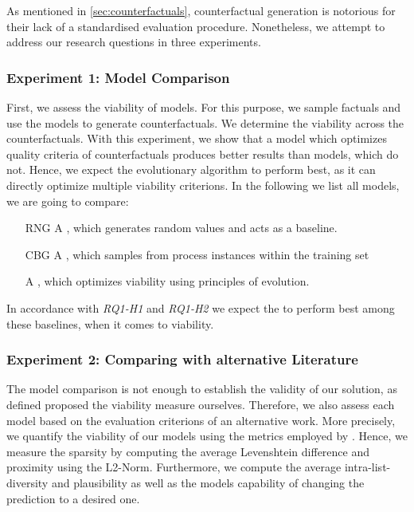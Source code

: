 \documentclass[./../../paper.tex]{subfiles}
\begin{document}
As mentioned in \autoref{sec:counterfactuals}, counterfactual generation is notorious for their lack of a standardised evaluation procedure. Nonetheless, we attempt to address our research questions in three experiments.

\subsubsection{Experiment 1: Model Comparison}
First, we assess the viability of  models. For this purpose, we sample  factuals and use the models to generate  counterfactuals. We determine the  viability across the counterfactuals. With this experiment, we show that a model which optimizes quality criteria of counterfactuals produces better results than models, which do not. Hence, we expect the evolutionary algorithm to perform best, as it can directly optimize multiple viability criterions. In the following we list all models, we are going to compare:

\begin{enumerate}
    \item[RNG] A \ModelRNG, which generates random values and acts as a baseline. 
    \item[CBG] A \ModelCBG, which samples from process instances within the training set
    \item[\ModelEVO] A \ModelEVOFSR, which optimizes viability using principles of evolution.
\end{enumerate}

In accordance with \emph{RQ1-H1} and \emph{RQ1-H2} we expect the \ModelEVOFSR to perform best among these baselines, when it comes to viability.

\subsubsection{Experiment 2: Comparing with alternative Literature}
The model comparison is not enough to establish the validity of our solution, as defined proposed the viability measure ourselves. Therefore, we also assess each model based on the evaluation criterions of an alternative work. More precisely, we quantify the viability of our models using the metrics employed by \citeauthor{hsieh_DiCE4ELInterpretingProcess_2021}. Hence, we measure the sparsity by computing the average Levenshtein difference and proximity using the L2-Norm. Furthermore, we compute the average intra-list-diversity and plausibility as well as the models capability of changing the prediction to a desired one. 
\end{document}
